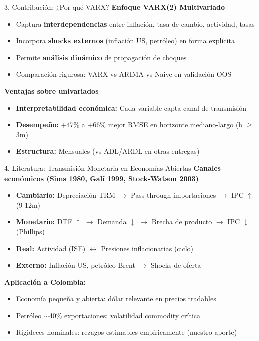 \documentclass[spanish, 11pt]{beamer}
\begin{document}
\begin{frame}{3. Contribución: ¿Por qué VARX?}
\normalsize
\vspace{0.3cm}
\textbf{Enfoque VARX(2) Multivariado}
\begin{itemize}
  \item Captura \textbf{interdependencias} entre inflación, tasa de cambio, actividad, tasas
  \item Incorpora \textbf{shocks externos} (inflación US, petróleo) en forma explícita
  \item Permite \textbf{análisis dinámico} de propagación de choques
  \item Comparación rigurosa: VARX vs ARIMA vs Naive en validación OOS
\end{itemize}

\vspace{0.4cm}
\textbf{Ventajas sobre univariados}
\begin{itemize}
  \item \textbf{Interpretabilidad económica:} Cada variable capta canal de transmisión
  \item \textbf{Desempeño:} +47\% a +66\% mejor RMSE en horizonte mediano-largo (h $\geq$ 3m)
  \item \textbf{Estructura:} Mensuales (vs ADL/ARDL en otras entregas)
\end{itemize}
\end{frame}

\begin{frame}{4. Literatura: Transmisión Monetaria en Economías Abiertas}
\normalsize
\vspace{0.2cm}
\textbf{Canales económicos (Sims 1980, Galí 1999, Stock-Watson 2003)}

\begin{itemize}
  \item \textbf{Cambiario:} Depreciación TRM $\rightarrow$ Pass-through importaciones $\rightarrow$ IPC $\uparrow$ (9-12m)
  \item \textbf{Monetario:} DTF $\uparrow$ $\rightarrow$ Demanda $\downarrow$ $\rightarrow$ Brecha de producto $\rightarrow$ IPC $\downarrow$ (Phillips)
  \item \textbf{Real:} Actividad (ISE) $\leftrightarrow$ Presiones inflacionarias (ciclo)
  \item \textbf{Externo:} Inflación US, petróleo Brent $\rightarrow$ Shocks de oferta
\end{itemize}

\vspace{0.3cm}
\textbf{Aplicación a Colombia:}
\begin{itemize}
  \item Economía pequeña y abierta: dólar relevante en precios tradables
  \item Petróleo $\sim$40\% exportaciones: volatilidad commodity crítica
  \item Rigideces nominales: rezagos estimables empíricamente (nuestro aporte)
\end{itemize}
\end{frame}
\end{document}
